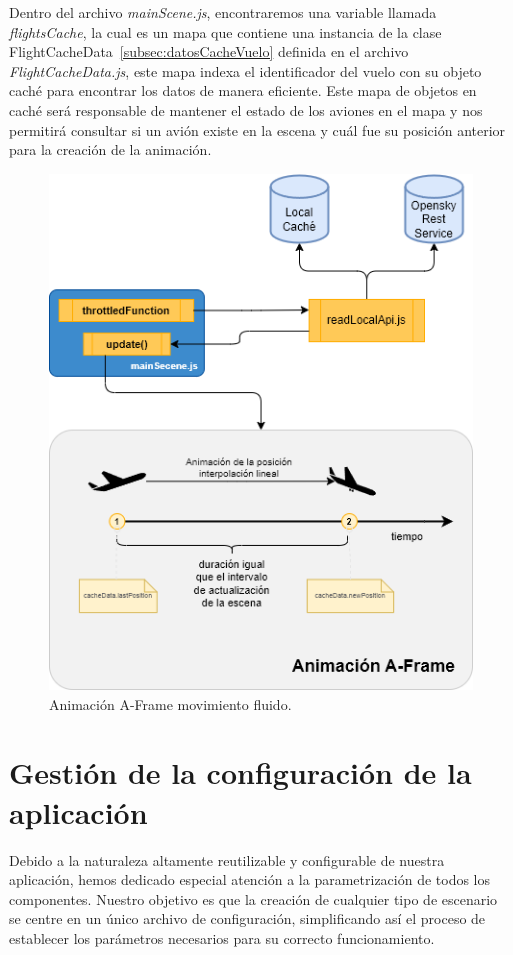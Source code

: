 \documentclass[a4paper, 11pt]{book}
\begin{document}
Dentro del archivo \emph{mainScene.js}, encontraremos una variable llamada \emph{flightsCache}, la cual es un mapa que contiene una instancia de la clase FlightCacheData~\ref{subsec:datosCacheVuelo} definida en el archivo \emph{FlightCacheData.js}, este mapa indexa el identificador del vuelo con su objeto caché para encontrar los datos de manera eficiente. Este mapa de objetos en caché será responsable de mantener el estado de los aviones en el mapa y nos permitirá consultar si un avión existe en la escena y cuál fue su posición anterior para la creación de la animación.
\begin{figure}[h]
	\centering
	\includegraphics[width=12cm, keepaspectratio]{img/movimientoFluido.drawio.png}
	\caption{Animación A-Frame movimiento fluido.}
	\label{fig:movimientoFluido}
\end{figure}


\clearpage
\section{Gestión de la configuración de la aplicación}
\label{sec:configuration}
Debido a la naturaleza altamente reutilizable y configurable de nuestra aplicación, hemos dedicado especial atención a la parametrización de todos los componentes. Nuestro objetivo es que la creación de cualquier tipo de escenario se centre en un único archivo de configuración, simplificando así el proceso de establecer los parámetros necesarios para su correcto funcionamiento.
\end{document}
